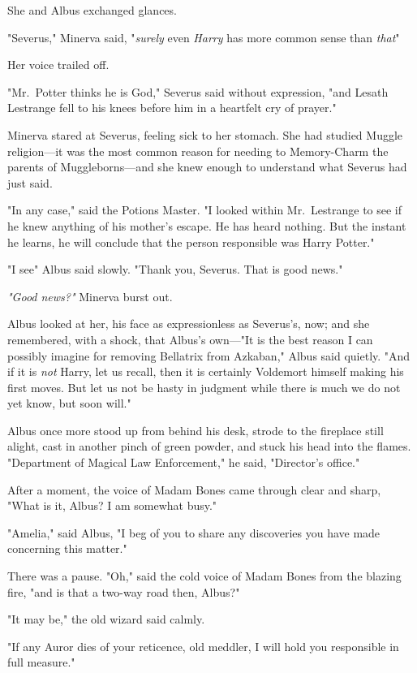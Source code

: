 She and Albus exchanged glances.

"Severus," Minerva said, "\emph{surely{\el}} even \emph{Harry}{\el} has
more common sense than \emph{that{\el}}"

Her voice trailed off.

"Mr.~Potter thinks he is God," Severus said without expression, "and Lesath
Lestrange fell to his knees before him in a heartfelt cry of prayer."

Minerva stared at Severus, feeling sick to her stomach. She had studied Muggle
religion---it was the most common reason for needing to Memory-Charm the
parents of Muggleborns---and she knew enough to understand what Severus had
just said.

"In any case," said the Potions Master. "I looked within Mr.~Lestrange to see
if he knew anything of his mother's escape. He has heard nothing. But the
instant he learns, he will conclude that the person responsible was Harry
Potter."

"I see{\el}" Albus said slowly. "Thank you, Severus. That is good news."

\emph{"Good news?"} Minerva burst out.

Albus looked at her, his face as expressionless as Severus's, now; and she
remembered, with a shock, that Albus's own\mbox{---}"It is the best reason I can
possibly imagine for removing Bellatrix from Azkaban," Albus said quietly. "And
if it is \emph{not} Harry, let us recall, then it is certainly Voldemort
himself making his first moves. But let us not be hasty in judgment while there
is much we do not yet know, but soon will."

Albus once more stood up from behind his desk, strode to the fireplace still
alight, cast in another pinch of green powder, and stuck his head into the
flames. "Department of Magical Law Enforcement," he said, "Director's office."

After a moment, the voice of Madam Bones came through clear and sharp, "What is
it, Albus? I am somewhat busy."

"Amelia," said Albus, "I beg of you to share any discoveries you have made
concerning this matter."

There was a pause. "Oh," said the cold voice of Madam Bones from the blazing
fire, "and is that a two-way road then, Albus?"

"It may be," the old wizard said calmly.

"If any Auror dies of your reticence, old meddler, I will hold you responsible
in full measure."

